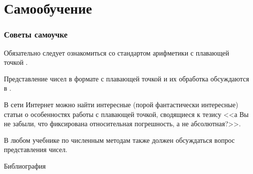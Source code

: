 \section{Самообучение}

\begin{frame}
    \frametitle{Советы самоучке}

    Обязательно следует ознакомиться со стандартом арифметики с плавающей точкой \cite{IEEE:754}.
    
    Представление чисел в формате с плавающей точкой и их обработка обсуждаются в \cite{bib:saveliev:automateTheory, bib:lisikov:automateBase}.
    
    В сети Интернет можно найти интересные (порой фантастически интересные) статьи о особенностях работы с плавающей точкой, сводящиеся к тезису <<а Вы не забыли, что фиксирована относительная погрешность, а не абсолютная?>>.
    
    В любом учебнике по численным методам также должен обсуждаться вопрос представления чисел.
\end{frame}

\begin{frame}[allowframebreaks]{Библиография}
    
    
\end{frame}






